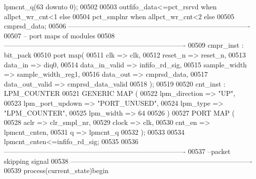 \begin{DoxyCode}
{      lpmcnt_q}\textcolor{vhdlchar}{(}\textcolor{vhdllogic}{}\textcolor{vhdllogic}{63} \textcolor{keywordflow}{downto} \textcolor{vhdllogic}{}\textcolor{vhdllogic}{0}\textcolor{vhdlchar}{)};                  
00502 
00503 \textcolor{vhdlchar}{outfifo_data}\textcolor{vhdlchar}{<=}\textcolor{vhdlchar}{pct_rsrvd} \textcolor{keywordflow}{when} \textcolor{vhdlchar}{allpct_wr_cnt}\textcolor{vhdlchar}{<}\textcolor{vhdllogic}{}\textcolor{vhdllogic}{1} \textcolor{keywordflow}{else} 
00504               \textcolor{vhdlchar}{pct_smplnr}    \textcolor{keywordflow}{when} \textcolor{vhdlchar}{allpct_wr_cnt}\textcolor{vhdlchar}{<}\textcolor{vhdllogic}{}\textcolor{vhdllogic}{2} \textcolor{keywordflow}{else} 
00505               \textcolor{vhdlchar}{cmprsd_data};
00506 \textcolor{keyword}{-------------------------------------------------------------------------------}
00507 \textcolor{keyword}{-- port maps of modules}
00508 \textcolor{keyword}{-------------------------------------------------------------------------------              }
00509 cmpr_inst : bit_pack 
00510   \textcolor{keywordflow}{port} \textcolor{keywordflow}{map}(
00511         clk             => clk, 
00512         reset_n         => reset_n,
00513         data_in         => diq0,
00514         data_in_valid   => infifo_rd_sig,
00515         sample_width    => sample_width_reg1, 
00516         data_out        => cmprsd_data,
00517         data_out_valid  => cmprsd_data_valid     
00518         \textcolor{vhdlchar}{)};
00519         
00520         cnt_inst : LPM\_COUNTER
00521     \textcolor{keywordflow}{GENERIC} \textcolor{keywordflow}{MAP} (
00522         lpm\_direction       => \textcolor{keyword}{"UP"},
00523         lpm\_port\_updown     => \textcolor{keyword}{"PORT\_UNUSED"},
00524         lpm\_type            => \textcolor{keyword}{"LPM\_COUNTER"},
00525         lpm\_width           => \textcolor{vhdllogic}{64}
00526     \textcolor{vhdlchar}{)}
00527     \textcolor{keywordflow}{PORT} \textcolor{keywordflow}{MAP} (
00528         aclr        => clr_smpl_nr,
00529         clock   => clk,
00530         cnt\_en  => lpmcnt_cnten,
00531         q           => lpmcnt_q
00532     \textcolor{vhdlchar}{)};
00533     
00534 \textcolor{vhdlchar}{lpmcnt_cnten}\textcolor{vhdlchar}{<=}\textcolor{vhdlchar}{infifo_rd_sig};
00535     
00536 \textcolor{keyword}{-------------------------------------------------------------------------------}
00537 \textcolor{keyword}{--packet skipping signal}
00538 \textcolor{keyword}{------------------------------------------------------------------------------- }
00539  \textcolor{keywordflow}{process}(current_state)\textcolor{keywordflow}{begin}

\end{DoxyCode}
